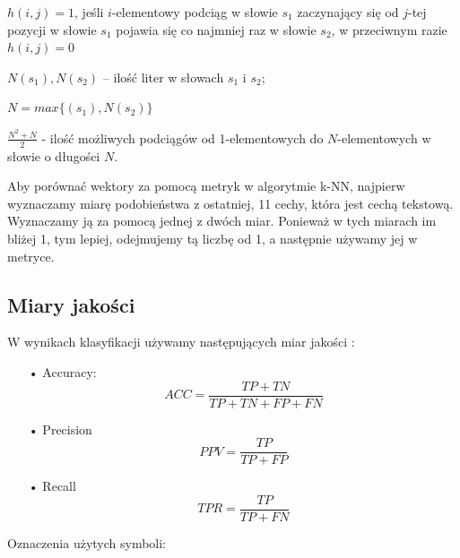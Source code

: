 \documentclass{classrep}
\let\bbordermatrix\bordermatrix
\begin{document}
\begin{enumerate}
$h(i,j) = 1$, jeśli $i$-elementowy podciąg w słowie $s_1$ zaczynający się od $j$-tej pozycji w słowie $s_1$ pojawia się co najmniej raz w  słowie $s_2$, w przeciwnym razie $h(i,j) = 0$

$N(s_1), N(s_2)$ – ilość liter w słowach $s_1$ i $s_2$;

$N = max\{(s_1), N(s_2)\}$

$\frac{N^2+N}{2}$ - ilość możliwych podciągów od 1-elementowych do $N$-elementowych w słowie o długości $N$.
\end{enumerate}

Aby porównać wektory za pomocą metryk w algorytmie k-NN, najpierw wyznaczamy miarę podobieństwa z ostatniej, 11 cechy, która jest cechą tekstową. Wyznaczamy ją za pomocą jednej z dwóch miar. Ponieważ w tych miarach im bliżej 1, tym lepiej, odejmujemy tą liczbę od 1, a następnie używamy jej w metryce.

\subsection{Miary jakości}
W wynikach klasyfikacji używamy następujących miar jakości \cite{apr}:
\begin{itemize}
\item[•] Accuracy:
\begin{equation}
ACC = \frac{TP + TN}{TP + TN + FP + FN}
\end{equation}
\item[•] Precision
\begin{equation}
PPV = \frac{TP}{TP + FP}
\end{equation}
\item[•] Recall
\begin{equation}
TPR = \frac{TP}{TP + FN}
\end{equation}
\end{itemize}
Oznaczenia użytych symboli:
\end{document}
